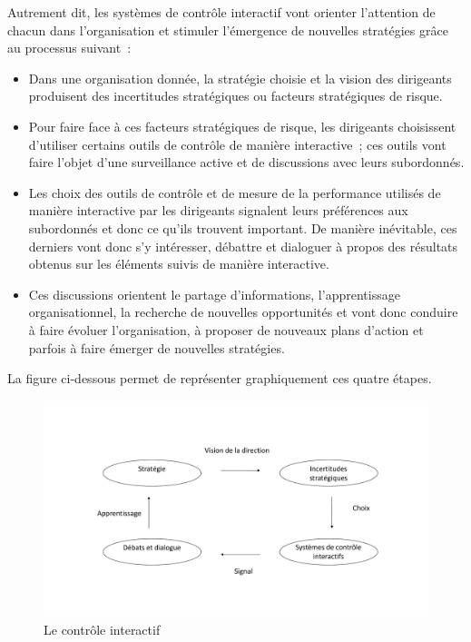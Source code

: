 \documentclass{tufte-handout}
\begin{document}
\begin{enumerate}
Autrement dit, les systèmes de contrôle interactif vont orienter l'attention de chacun dans l'organisation et stimuler l'émergence de nouvelles stratégies grâce au processus suivant :\\
\begin{itemize}
\item Dans une organisation donnée, la stratégie choisie et la vision des dirigeants produisent des incertitudes stratégiques ou facteurs stratégiques de risque.\\
\item Pour faire face à ces facteurs stratégiques de risque, les dirigeants choisissent d'utiliser certains outils de contrôle de manière interactive ; ces outils vont faire l'objet d'une surveillance active et de discussions avec leurs subordonnés.\\
\item Les choix des outils de contrôle et de mesure de la performance utilisés de manière interactive par les dirigeants signalent leurs préférences aux subordonnés et donc ce qu'ils trouvent important. De manière inévitable, ces derniers vont donc s'y intéresser, débattre et dialoguer à propos des résultats obtenus sur les éléments suivis de manière interactive.\\
\item Ces discussions orientent le partage d'informations, l'apprentissage organisationnel, la recherche de nouvelles opportunités et vont donc conduire à faire évoluer l'organisation, à proposer de nouveaux plans d'action et parfois à faire émerger de nouvelles stratégies.\\
\end{itemize}
La figure ci-dessous permet de représenter graphiquement ces quatre étapes.\\

\begin{figure}[htbp]
\centering
\includegraphics[width=.9\linewidth]{./img/inter.pdf}
\caption{Le contrôle interactif}
\end{figure}


\end{enumerate}
\end{document}
